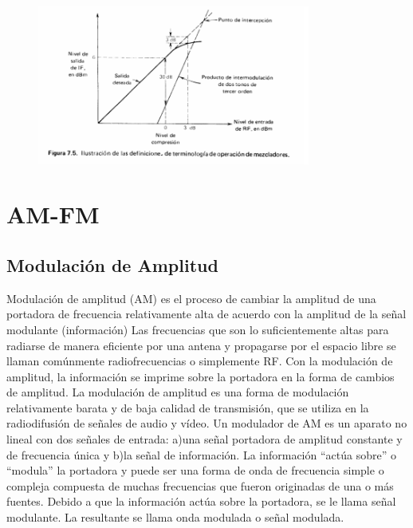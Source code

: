 \documentclass[a4paper,12pt,twoside]{article}
\begin{document}
\begin{figure}[H]
    \centering
    \includegraphics[width=0.8\textwidth]{../img/mezclador.png}
\end{figure}


\section{AM-FM}
\subsection{Modulación de Amplitud}
Modulación de amplitud (AM) es el proceso de cambiar la amplitud de una portadora de frecuencia relativamente
alta de acuerdo con la amplitud de la señal modulante (información) Las frecuencias que son lo suficientemente altas
para radiarse de manera eficiente por una antena y propagarse por el espacio libre se llaman comúnmente radiofrecuencias o simplemente RF. 
Con la modulación de amplitud, la información se imprime sobre la portadora en la forma de cambios de amplitud. 
La modulación de amplitud es una forma de modulación relativamente barata y de baja calidad de transmisión,
 que se utiliza en la radiodifusión de señales de audio y vídeo.
Un modulador de AM es un aparato no lineal con dos señales de entrada: a)una señal portadora de amplitud constante 
y de frecuencia única y b)la señal de información. La información “actúa sobre” o “modula” la portadora y puede
ser una forma de onda de frecuencia simple o compleja compuesta de muchas frecuencias que fueron originadas de una o
más fuentes. Debido a que la información actúa sobre la portadora, se le llama señal modulante. La resultante se llama
onda modulada o señal modulada.
\end{document}
